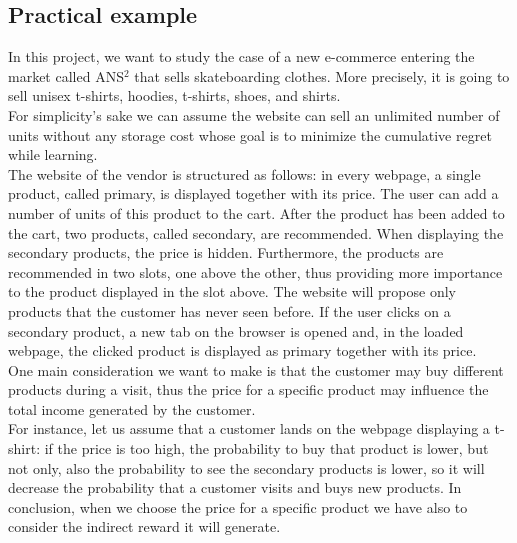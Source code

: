 \subsection*{Practical example}
In this project, we want to study the case of a new e-commerce entering the market called ANS$^2$ that sells skateboarding clothes. More precisely, it is going to sell unisex t-shirts, hoodies, t-shirts, shoes, and shirts.\\ For simplicity's sake we can assume the website can sell an unlimited number of units without any storage cost whose goal is to minimize the cumulative regret while learning.\\
The website of the vendor is structured as follows: in every webpage, a single product, called primary, is displayed together with its price. The user can add a number of units of this product to the cart. After the product has been added to the cart, two products, called secondary, are recommended. When displaying the secondary products, the price is hidden. Furthermore, the products are recommended in two slots, one above the other, thus providing more importance to the product displayed in the slot above. The website will propose only products that the customer has never seen before.
If the user clicks on a secondary product, a new tab on the browser is opened and, in the loaded webpage, the clicked product is displayed as primary together with its price.\\
One main consideration we want to make is that the customer may buy different products during a visit, thus the price for a specific product may influence the total income generated by the customer.\\ For instance, let us assume that a customer lands on the webpage displaying a t-shirt: if the price is too high, the probability to buy that product is lower, but not only, also the probability to see the secondary products is lower, so it will decrease the probability that a customer visits and buys new products. In conclusion, when we choose the price for a specific product we have also to consider the indirect reward it will generate.
